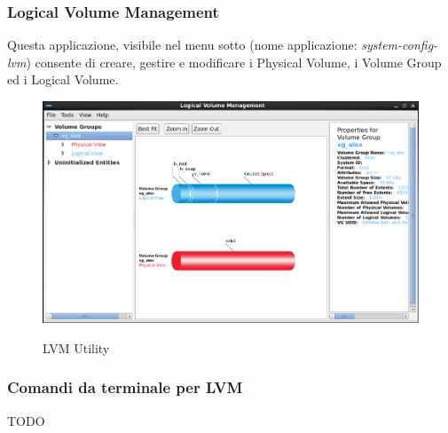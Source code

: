 \subsubsection{Logical Volume Management}

Questa applicazione, visibile nel menu sotto  (nome applicazione: \textit{system-config-lvm}) consente di creare, gestire e modificare i Physical Volume, i Volume Group ed i Logical Volume.

\begin{figure}[!ht]
 \centering
 \includegraphics[scale=0.4]{Immagini/LVM_utility.png}
 \label{fig:LVM Utility}
 \caption{LVM Utility}
\end{figure}


\subsubsection{Comandi da terminale per LVM}

TODO

